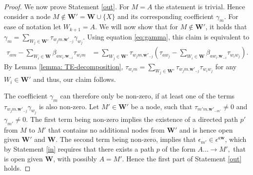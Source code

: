 \documentclass[11pt,a4paper]{article}
\theoremstyle{definition}
\theoremstyle{remark}
\begin{document}
\begin{proof}
	
	
	
	We now prove Statement \eqref{out}. For $M=A$ the statement is trivial. Hence consider a node $M \notin \mathbf{W'}=\mathbf{W} \cup \{X\}$ and its corresponding coefficient $\gamma_m$. For ease of notation let $W_{k+1}=A$. We will now show that for $M \notin \mathbf{W'}$, it holds that $\gamma_m = \sum_{W_j \in \mathbf{W'}} \tau_{{w_j}m.\mathbf{w'}_{-j}} \gamma_{w_j}$.
Using equation \eqref{eq:gamma}, this claim is equivalent to
	\begin{align*}
	\tau_{am}  - \sum_{W_i \in \mathbf{W}} \beta_{aw_i.\mathbf{w}_{-i}} \tau_{w_im} 
	&= \sum_{W_j \in \mathbf{W'}} \tau_{{w_j}m.\mathbf{w'}_{-j}} (\tau_{aw_j} -  \sum_{W_i \in \mathbf{W}} \beta_{aw_i.\mathbf{w}_{-i}} \tau_{w_iw_j}). 
	\end{align*}
	By Lemma \ref{lemma: TE-decomposition}, $\tau_{w_im} = \sum_{W_j \in \mathbf{W'}} \tau_{w_jm.\mathbf{w'}_{-j}} \tau_{w_iw_j}$ for any $W_i \in \mathbf{W' }$ and thus, our claim follows. 
	
	The coefficient $\gamma_m$ can therefore only be non-zero, if at least one of the terms $\tau_{{w_j}m.\mathbf{w'}_{-j}} \gamma_{w_j}$ is also non-zero. Let $M' \in \mathbf{W'}$ be a node, such that $\tau_{m'm.\mathbf{w'}_{-m'}} \neq 0$ and $\gamma_{m'}\neq 0$. The first term being non-zero implies the existence of a directed path $p'$ from $M$ to $M'$ that contains no additional nodes from $\mathbf{W'}$ and is hence open given $\mathbf{W'}$ and $\mathbf{W}$. The second term being non-zero, implies that $\epsilon_{m'} \in \epsilon^{a\mathbf{w}}$, which by Statement \eqref{in} requires that there exists a path $p$ of the form
	$
	A \dots \rightarrow M',
	$
	that is open given $\mathbf{W}$, with possibly $A=M'$. Hence the first part of Statement \eqref{out} holds.
	
	

	
	

\end{proof}
\end{document}
